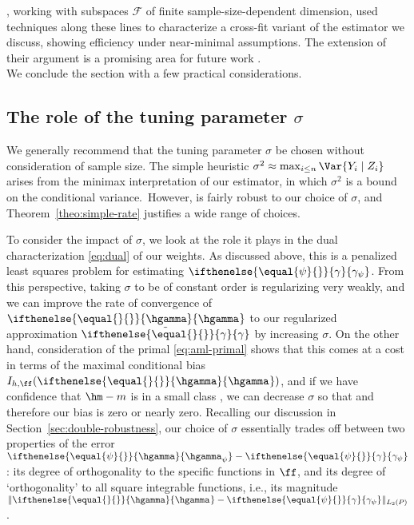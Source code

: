 \documentclass[aos,submission]{imsart}
\theoremstyle{plain}
\theoremstyle{remark}
\newcommand{\riesz}[1][]{\ifthenelse{\equal{#1}{}}{\gamma}{\gamma_{{#1}}}}
\newcommand{\hriesz}[1][]{\ifthenelse{\equal{#1}{}}{\hgamma}{\hgamma_{{#1}}}}
\DeclarePairedDelimiter\norm{\lVert}{\rVert}
\newcommand{\F}{\mathcal{F}}
\begin{document}
\citet{newey2018cross}, working with subspaces $\F$ of finite sample-size-dependent dimension,
used techniques along these lines to characterize a cross-fit variant of the estimator we discuss, 
showing efficiency under near-minimal assumptions. The extension of their argument is a
promising area for future work \citep[see also][]{kennedy2020optimal}.  
\ \\

We conclude the section with a few practical considerations.

\subsection{The role of the tuning parameter $\sigma$}
\label{sec:tuning-sigma}
We generally recommend that the tuning parameter $\sigma$ be chosen without consideration of sample size. 
The simple heuristic $\sigma^2 \approx \max_{i \le n}\Var{Y_i \mid Z_i}$ arises 
from the minimax interpretation of our estimator, in which $\sigma^2$ is a bound on the conditional variance.\footnotemark\ 
However,  is fairly robust to our choice of $\sigma$, and Theorem~\ref{theo:simple-rate} 
justifies a wide range of choices.


To consider the impact of $\sigma$, we look at the role it plays in the dual characterization \eqref{eq:dual} of our weights.
As discussed above, this is a penalized least squares problem for estimating $\riesz[\psi]$.
From this perspective, taking $\sigma$ to be of constant order is regularizing very weakly, 
and we can improve the rate of convergence of $\hriesz$ to our regularized approximation $\tilde\riesz$ by increasing $\sigma$. On the other hand, 
consideration of the primal \eqref{eq:aml-primal} shows that this comes at a cost in terms of the 
maximal conditional bias $I_{h,\ff}(\hriesz)$, and if we have confidence that $\hm-m$ is in a small class \smash{$\ff$},
we can decrease $\sigma$ so that \smash{$I_{h,\ff}(\hriesz)$} and therefore our bias is zero or nearly zero.  
Recalling our discussion in Section~\ref{sec:double-robustness}, our choice of $\sigma$ essentially trades off between two properties of 
the error $\hriesz[\psi]-\riesz[\psi]$: its degree of orthogonality to the specific functions in $\ff$, and its degree of `orthogonality' to all 
square integrable functions, i.e., its magnitude $\norm{\hriesz - \riesz[\psi]}_{L_2(\P)}$.
\end{document}
